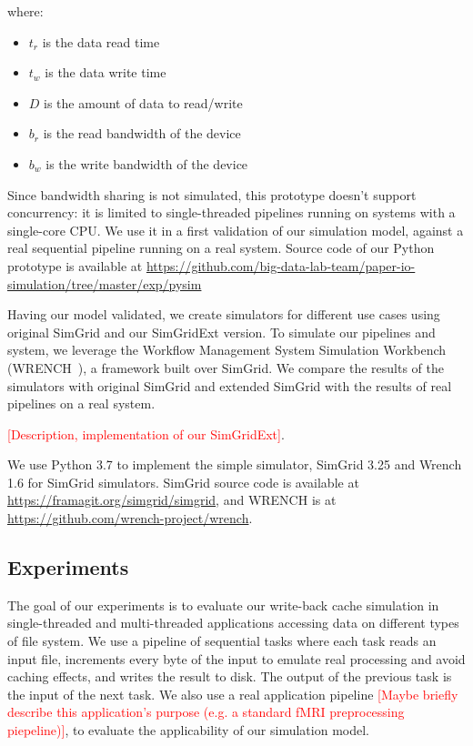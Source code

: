 \documentclass[conference]{IEEEtran}
\begin{document}
			where:
			\begin{itemize}
				\item $t_{r}$ is the data read time
				\item $t_{w}$ is the data write time
				\item $D$ is the amount of data to read/write
				\item $b_r$ is the read bandwidth of the device
				\item $b_w$ is the write bandwidth of the device
			\end{itemize}			

			Since bandwidth sharing is not simulated, this prototype doesn't support 
			concurrency: it is limited to single-threaded pipelines running on systems 
			with a single-core CPU. We use it in a first validation of our simulation 
			model, against a real sequential pipeline running on a real system.
			Source code of our Python prototype is available at 
            \url{https://github.com/big-data-lab-team/paper-io-simulation/tree/master/exp/pysim}
			
			Having our model validated, we create simulators for different use cases 
			using original SimGrid and our SimGridExt version. 
			To simulate our pipelines and system, we leverage 
			the Workflow Management System Simulation Workbench 
			(WRENCH~\cite{wrench}), a framework  built over SimGrid.
		    We compare the results of the simulators with
			original SimGrid and extended SimGrid with the results of real
			pipelines on a real system. 
			
			\textcolor{red}{[Description, implementation of our SimGridExt]}. 
		
			We use Python 3.7 to implement the simple simulator, SimGrid 3.25
			and Wrench 1.6 for SimGrid simulators. SimGrid source code is
			available at \url{https://framagit.org/simgrid/simgrid}, and WRENCH
			is at \url{https://github.com/wrench-project/wrench}.
			
		\subsection{Experiments}
		
        	The goal of our experiments is to evaluate our write-back cache 
			simulation in single-threaded and multi-threaded applications
			accessing data on different types of file system. We use a pipeline
			of sequential tasks where each task reads an input file, increments
			every byte of the input to emulate real processing and avoid caching
			effects, and writes the result to disk. The output of the previous
			task is the input of the next task. We also use a real application 
            pipeline \textcolor{red}{[Maybe briefly describe this application's purpose (e.g. a standard fMRI preprocessing piepeline)]}, to evaluate the applicability of our simulation model. 
			
\end{document}
